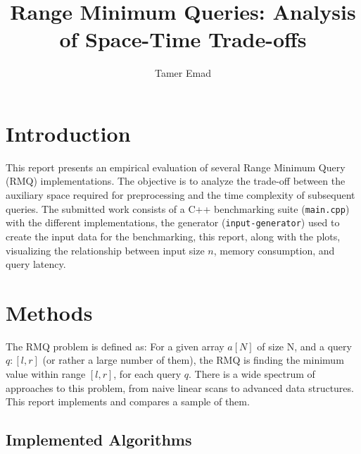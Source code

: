 \documentclass[a4paper,UKenglish,cleveref,thm-restate]{lipics-v2021}
\title{Range Minimum Queries: Analysis of Space-Time Trade-offs}
\author{Tamer Emad}{Karlsruhe Institute of Technology, Germany}{}{}{}
\begin{document}
\maketitle

\section{Introduction}
This report presents an empirical evaluation of several Range Minimum Query (RMQ) implementations. The objective is to analyze the trade-off between the auxiliary space required for preprocessing and the time complexity of subsequent queries. The submitted work consists of a C++ benchmarking suite (\texttt{main.cpp}) with the different implementations, the generator (\texttt{input-generator}) used to create the input data for the benchmarking, this report, along with the plots, visualizing the relationship between input size $n$, memory consumption, and query latency.

\section{Methods}
The RMQ problem is defined as: For a given array $a[N]$ of size N, and a query $q: [l, r]$ (or rather a large number of them), the RMQ is finding the minimum value within range $[l, r]$, for each query $q$. There is a wide spectrum of approaches to this problem, from naive linear scans to advanced data structures. This report implements and compares a sample of them.

\subsection{Implemented Algorithms}
\end{document}
